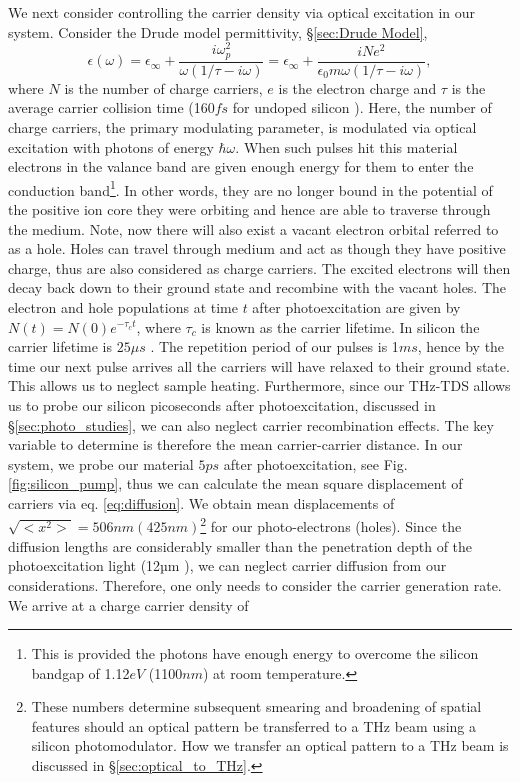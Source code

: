 We next consider controlling the carrier density via optical excitation in our system. Consider the Drude model permittivity, \S\ref{sec:Drude Model},
\begin{equation}
\epsilon(\omega)=\epsilon_{\infty}+\frac{i \omega_p^2}{\omega(1/\tau-i\omega)}=\epsilon_{\infty}+\frac{i N e^2}{\epsilon_0 m \omega(1/\tau-i\omega)},
\label{eq:drude_perm}
\end{equation}
where $N$ is the number of charge carriers, $e$ is the electron charge and $\tau$ is the average carrier collision time (160$fs$ for undoped silicon \cite{Silicon_conduction}). Here, the number of charge carriers, the primary modulating parameter, is modulated via optical excitation with photons of energy $\hbar \omega$. When such pulses hit this material electrons in the valance band are given enough energy for them to enter the conduction band\footnote{This is provided the photons have enough energy to overcome the silicon bandgap of 1.12$eV$ (1100$nm$) at room temperature.}. In other words, they are no longer bound in the potential of the positive ion core they were orbiting and hence are able to traverse through the medium. Note, now there will also exist a vacant electron orbital referred to as a hole. Holes can travel through medium and act as though they have positive charge, thus are also considered as charge carriers. The excited electrons will then decay back down to their ground state and recombine with the vacant holes. The electron and hole populations at time $t$ after photoexcitation are given by $N(t)=N(0)e^{-\tau_c t}$, where $\tau_c$ is known as the carrier lifetime. In silicon the carrier lifetime is $25\mu s$ \cite{si_lifetime}. The repetition period of our pulses is 1$ms$, hence by the time our next pulse arrives all the carriers will have relaxed to their ground state. This allows us to neglect sample heating. Furthermore, since our THz-TDS allows us to probe our silicon picoseconds after photoexcitation, discussed in \S\ref{sec:photo_studies}, we can also neglect carrier recombination effects. The key variable to determine is therefore the mean carrier-carrier distance. In our system, we probe our material $5ps$ after photoexcitation, see Fig. \ref{fig:silicon_pump}, thus we can calculate the mean square displacement of carriers via eq. \eqref{eq:diffusion}. %
We obtain mean displacements of $\sqrt{<x^2>}=506nm(425nm)$\footnote{These numbers determine subsequent smearing and broadening of spatial features should an optical pattern be transferred to a THz beam using a silicon photomodulator. How we transfer an optical pattern to a THz beam is discussed in \S\ref{sec:optical_to_THz}.} for our photo-electrons (holes). Since the diffusion lengths are considerably smaller than the penetration depth of the photoexcitation light (12µm \cite{si_depth}), we can neglect carrier diffusion from our considerations. Therefore, one only needs to consider the carrier generation rate. We arrive at a charge carrier density of
